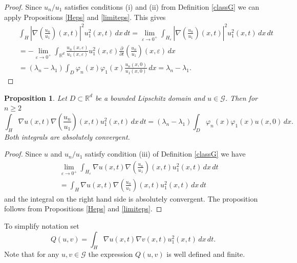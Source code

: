 \documentclass[11pt,leqno]{article}
\newtheorem{prop}{Proposition}[section]
\theoremstyle{definition}
\newcommand{\Rd}{\mathbb{R}^d}
\newcommand{\eps}{\varepsilon}
\numberwithin{equation}{section}
\begin{document}
\begin{proof}
Since $u_n/u_1$ satisfies conditions (i) and (ii) from Definition \ref{classG} we can apply Propositions \ref{Heps} and \ref{limiteps}. This gives
\begin{eqnarray*}
&&
\int_{H}  \left| \nabla \left(\frac{u_n}{u_1}\right)(x,t)\right|^2 u_1^2(x,t) \, dx \, dt
= \lim_{\eps \to 0^+} 
\int_{H_{\eps}}  \left| \nabla \left(\frac{u_n}{u_1}\right)(x,t)\right|^2 u_1^2(x,t) \, dx \, dt
\\
&&
= - \lim_{\eps \to 0^+} \int_{\Rd} \frac{u_n(x,\eps)}{u_1(x,\eps)} u_1^2(x,\eps) \frac{\partial}{\partial t} \left(\frac{u_n}{u_1}\right)(x,\eps) \, dx
\\
&&
=  (\lambda_n - \lambda_1) \int_{D} \varphi_n(x) \varphi_1(x) 
\frac{u_n(x,0)}{u_1(x,0)} \, dx = \lambda_n - \lambda_1.
\end{eqnarray*}
\end{proof}

\begin{prop}
\label{uG}
Let $D \subset \Rd$ be a bounded Lipschitz domain and $u \in \mathcal{G}$. Then for 
 $n \ge 2$ 
$$
\int_{H} \nabla u(x,t) \nabla \left(\frac{u_n}{u_1}\right)(x,t) u_1^2(x,t) \, dx \, dt 
= (\lambda_n - \lambda_1) \int_{D} \varphi_n(x) \varphi_1(x) u(x,0) \, dx. 
$$
Both integrals are absolutely convergent.
\end{prop}

\begin{proof}
Since $u$ and $u_n/u_1$ satisfy condition (iii) of Definition \ref{classG} we have
\begin{eqnarray*}
&&
\lim_{\eps \to 0^+} \int_{H_{\eps}} \nabla u(x,t) \nabla \left(\frac{u_n}{u_1}\right)(x,t) u_1^2(x,t) \, dx \, dt \\
&&
= \int_{H} \nabla u(x,t) \nabla \left(\frac{u_n}{u_1}\right)(x,t) u_1^2(x,t) \, dx \, dt
\end{eqnarray*} 
and the integral on the right hand side is absolutely convergent.  The proposition follows
from Propositions \ref{Heps} and \ref{limiteps}.
\end{proof}

To simplify notation set
$$
Q(u,v) = \int_{H} \nabla u(x,t) \nabla v(x,t) u_1^2(x,t) \, dx \, dt.
$$
Note that for any $u,v \in \mathcal{G}$ the expression $Q(u,v)$ is well defined and finite.
\end{document}
